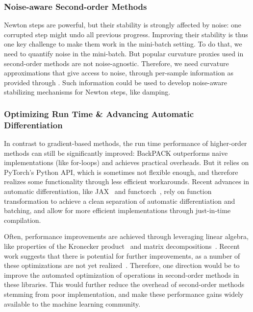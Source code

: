 \subsubsection{Noise-aware Second-order Methods}

Newton steps are powerful, but their stability is strongly affected by noise:
one corrupted step might undo all previous progress. Improving their stability
is thus one key challenge to make them work in the mini-batch setting. To do
that, we need to quantify noise in the mini-batch. But popular curvature proxies
used in second-order methods are not noise-agnostic. Therefore, we need
curvature approximations that give access to noise, \eg through per-sample
information as provided through \vivit. Such information could be used to
develop noise-aware stabilizing mechanisms for Newton steps, like damping.

\subsubsection{Optimizing Run Time \& Advancing Automatic Differentiation}

In contrast to gradient-based methods, the run time performance of higher-order
methods can still be significantly improved: \eg BackPACK outperforms naive
implementations (like for-loops) and achieves practical overheads. But it relies
on PyTorch's Python API, which is sometimes not flexible enough, and therefore
realizes some functionality through less efficient workarounds. Recent advances
in automatic differentiation, like JAX~\cite{bradbury2018jax} and
functorch~\cite{he2021functorch}, rely on function transformation to achieve a
clean separation of automatic differentiation and batching, and allow for more
efficient implementations through just-in-time compilation.

Often, performance improvements are achieved through leveraging linear algebra,
like properties of the Kronecker product~\cite{loan2000ubiquitous} and matrix
decompositions~\cite[\eg\!][]{dangel2020backpack,dangel2022vivit}. Recent work
suggests that there is potential for further improvements, as a number of these
optimizations are not yet realized~\cite{sankaran2022benchmarking}. Therefore,
one direction would be to improve the automated optimization of operations in
second-order methods in these libraries. This would further reduce the overhead
of second-order methods stemming from poor implementation, and make these
performance gains widely available to the machine learning community.

